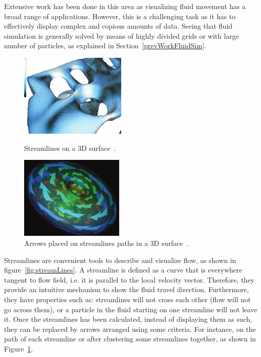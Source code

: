 Extensive work has been done in this area as visualizing fluid movement has a broad range of applications.
However, this is a challenging task as it has to effectively display complex and copious amounts of data.
Seeing that fluid simulation is generally solved by means of highly divided grids or with large number of particles, as explained in Section~\ref{prevWorkFluidSim}.

\begin{figure}
	\centering
	\begin{minipage}[t]{.45\textwidth}
		\centering
		\includegraphics[width=.8\textwidth,height=4cm]{images/streamLinesSpencer}
		\caption{Streamlines on a 3D surface~\cite{Spencer2009}.}
		\label{fig:streamLines}
	\end{minipage}\hfill
	\begin{minipage}[t]{.45\textwidth}
		\centering
		\includegraphics[width=.8\textwidth,height=4cm]{images/streamArrows}
		\caption{Arrows placed on streamlines paths in a 3D surface~\cite{loffelmann1998}.}
		\label{fig:streamArrows}
	\end{minipage}
\end{figure}

Streamlines are convenient tools to describe and visualize flow, as shown in figure~\ref{fig:streamLines}.
A streamline is defined as a curve that is everywhere tangent to flow field, i.e. it is parallel to the local velocity vector.
Therefore, they provide an intuitive mechanism to show the fluid travel direction.
Furthermore, they have properties such as: streamlines will not cross each other (flow will not go across them), or a particle in the fluid starting on one streamline will not leave it.
Once the streamlines has been calculated, instead of displaying them as such, they can be replaced by arrows arranged using some criteria.
For instance, on the path of each streamline or after clustering some streamlines together, as shown in Figure~\ref{fig:streamArrows}.

